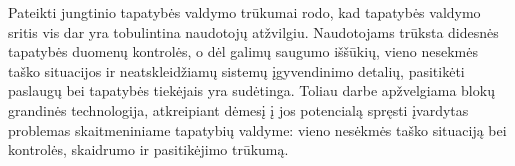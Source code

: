 Pateikti jungtinio tapatybės valdymo trūkumai rodo, kad tapatybės valdymo sritis vis dar yra tobulintina naudotojų atžvilgiu.
Naudotojams trūksta didesnės tapatybės duomenų kontrolės, o dėl galimų saugumo iššūkių, vieno nesekmės taško situacijos ir neatskleidžiamų
sistemų įgyvendinimo detalių, pasitikėti paslaugų bei tapatybės tiekėjais yra sudėtinga. Toliau darbe apžvelgiama blokų grandinės technologija, atkreipiant dėmesį
į jos potencialą spręsti įvardytas problemas skaitmeniniame tapatybių valdyme: vieno nesėkmės taško situaciją bei kontrolės, skaidrumo ir pasitikėjimo trūkumą.